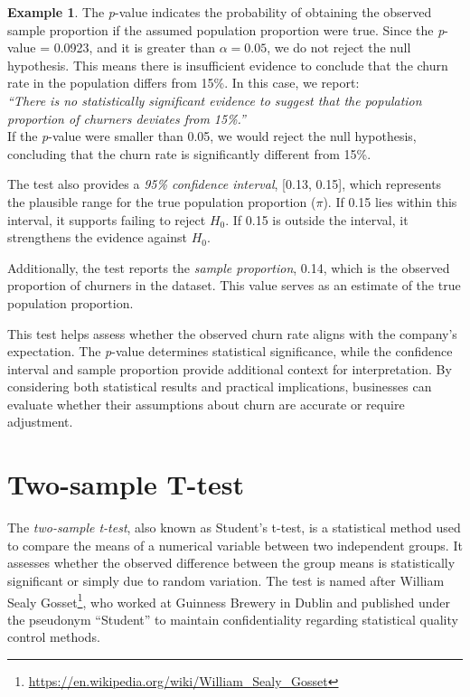 \documentclass[
  11pt,
]{book}
\renewcommand{\href}[2]{#2\footnote{\url{#1}}}
\theoremstyle{definition}
\theoremstyle{definition}
\newtheorem{example}{Example}[chapter]
\theoremstyle{definition}
\theoremstyle{definition}
\theoremstyle{remark}
\begin{document}
\begin{example}
The \emph{p}-value indicates the probability of obtaining the observed sample proportion if the assumed population proportion were true. Since the \emph{p}-value = 0.0923, and it is greater than \(\alpha = 0.05\), we do not reject the null hypothesis. This means there is insufficient evidence to conclude that the churn rate in the population differs from 15\%. In this case, we report:\\
\emph{``There is no statistically significant evidence to suggest that the population proportion of churners deviates from 15\%.''}\\
If the \emph{p}-value were smaller than 0.05, we would reject the null hypothesis, concluding that the churn rate is significantly different from 15\%.

The test also provides a \emph{95\% confidence interval}, {[}0.13, 0.15{]}, which represents the plausible range for the true population proportion (\(\pi\)). If 0.15 lies within this interval, it supports failing to reject \(H_0\). If 0.15 is outside the interval, it strengthens the evidence against \(H_0\).

Additionally, the test reports the \emph{sample proportion}, 0.14, which is the observed proportion of churners in the dataset. This value serves as an estimate of the true population proportion.
\end{example}

This test helps assess whether the observed churn rate aligns with the company's expectation. The \emph{p}-value determines statistical significance, while the confidence interval and sample proportion provide additional context for interpretation. By considering both statistical results and practical implications, businesses can evaluate whether their assumptions about churn are accurate or require adjustment.

\section{Two-sample T-test}\label{two-sample-t-test}

The \emph{two-sample t-test}, also known as Student's t-test, is a statistical method used to compare the means of a numerical variable between two independent groups. It assesses whether the observed difference between the group means is statistically significant or simply due to random variation. The test is named after \href{https://en.wikipedia.org/wiki/William_Sealy_Gosset}{William Sealy Gosset}, who worked at Guinness Brewery in Dublin and published under the pseudonym ``Student'' to maintain confidentiality regarding statistical quality control methods.
\end{document}

